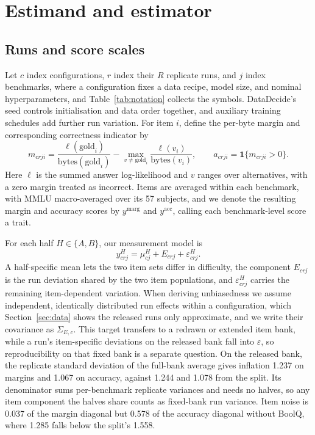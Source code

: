\section{Estimand and estimator}
\label{sec:estimator}
\subsection{Runs and score scales}
Let $c$ index configurations, $r$ index their $R$ replicate runs, and $j$ index benchmarks, where a configuration fixes a data recipe, model size, and nominal hyperparameters, and Table~\ref{tab:notation} collects the symbols. DataDecide's seed controls initialisation and data order together, and auxiliary training schedules add further run variation. For item $i$, define the per-byte margin and corresponding correctness indicator by
\begin{equation}
m_{crji}=\frac{\ell(\mathrm{gold}_i)}{\mathrm{bytes}(\mathrm{gold}_i)}-
\max_{v\ne\mathrm{gold}_i}\frac{\ell(v_i)}{\mathrm{bytes}(v_i)},
\qquad a_{crji}=\mathbf{1}\{m_{crji}>0\}.
\label{eq:scores}
\end{equation}
Here $\ell$ is the summed answer log-likelihood and $v$ ranges over alternatives, with a zero margin treated as incorrect. Items are averaged within each benchmark, with MMLU macro-averaged over its 57 subjects, and we denote the resulting margin and accuracy scores by $y^{\mathrm{marg}}$ and $y^{\mathrm{acc}}$, calling each benchmark-level score a trait.

For each half $H\in\{A,B\}$, our measurement model is
\begin{equation}
y^H_{crj}=\mu^H_{cj}+E_{crj}+\varepsilon^H_{crj}.
\label{eq:model}
\end{equation}
A half-specific mean lets the two item sets differ in difficulty, the component $E_{crj}$ is the run deviation shared by the two item populations, and $\varepsilon^H_{crj}$ carries the remaining item-dependent variation. When deriving unbiasedness we assume independent, identically distributed run effects within a configuration, which Section~\ref{sec:data} shows the released runs only approximate, and we write their covariance as $\Sigma_{E,c}$. This target transfers to a redrawn or extended item bank, while a run's item-specific deviations on the released bank fall into $\varepsilon$, so reproducibility on that fixed bank is a separate question. On the released bank, the replicate standard deviation of the full-bank average gives inflation 1.237  on margins and 1.067  on accuracy, against 1.244 and 1.078 from the split. Its denominator sums per-benchmark replicate variances and needs no halves, so any item component the halves share counts as fixed-bank run variance. Item noise is 0.037 of the margin diagonal but 0.578 of the accuracy diagonal without BoolQ, where 1.285 falls below the split's 1.558.

